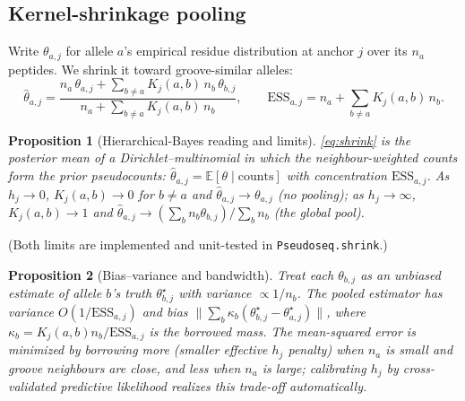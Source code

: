 \documentclass[11pt]{article}
\theoremstyle{oldplain}
\newtheorem{proposition}{Proposition}
\theoremstyle{oldrem}
\newcommand{\E}{\mathbb{E}}
\newcommand{\ESS}{\mathrm{ESS}}
\begin{document}
\subsection{Kernel-shrinkage pooling}
Write $\theta_{a,j}$ for allele $a$'s empirical residue distribution at anchor $j$ over its $n_a$
peptides. We shrink it toward groove-similar alleles:
\begin{equation}\label{eq:shrink}
  \hat\theta_{a,j}
  =\frac{n_a\,\theta_{a,j}+\sum_{b\neq a}K_j(a,b)\,n_b\,\theta_{b,j}}
        {n_a+\sum_{b\neq a}K_j(a,b)\,n_b},
  \qquad
  \ESS_{a,j}=n_a+\sum_{b\neq a}K_j(a,b)\,n_b .
\end{equation}
\begin{proposition}[Hierarchical-Bayes reading and limits]\label{prop:shrink}
\eqref{eq:shrink} is the posterior mean of a Dirichlet--multinomial in which the neighbour-weighted
counts form the prior pseudocounts: $\hat\theta_{a,j}=\E[\theta\mid \text{counts}]$ with
concentration $\ESS_{a,j}$. As $h_j\to0$, $K_j(a,b)\to0$ for $b\neq a$ and
$\hat\theta_{a,j}\to\theta_{a,j}$ (no pooling); as $h_j\to\infty$, $K_j(a,b)\to1$ and
$\hat\theta_{a,j}\to(\sum_b n_b\theta_{b,j})/\sum_b n_b$ (the global pool).
\end{proposition}
\noindent (Both limits are implemented and unit-tested in \texttt{Pseudoseq.shrink}.)

\begin{proposition}[Bias--variance and bandwidth]\label{prop:bv}
Treat each $\theta_{b,j}$ as an unbiased estimate of allele $b$'s truth $\theta^\star_{b,j}$ with
variance $\propto 1/n_b$. The pooled estimator has variance $O(1/\ESS_{a,j})$ and bias
$\big\|\sum_b \kappa_b(\theta^\star_{b,j}-\theta^\star_{a,j})\big\|$, where
$\kappa_b=K_j(a,b)n_b/\ESS_{a,j}$ is the borrowed mass. The mean-squared error is minimized by
borrowing more (smaller effective $h_j$ penalty) when $n_a$ is small and groove neighbours are close,
and less when $n_a$ is large; calibrating $h_j$ by cross-validated predictive likelihood realizes
this trade-off automatically.
\end{proposition}
\end{document}
